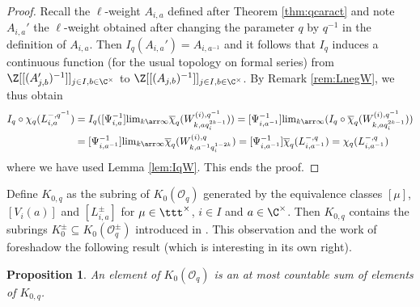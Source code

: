 \documentclass[11pt]{amsart}
\newtheorem{prop}[theorem]{Proposition}
\theoremstyle{definition}
\theoremstyle{remark}
\numberwithin{equation}{section}
\begin{document}
\begin{proof}
Recall the $\ell$-weight $A_{i,a}$ defined after Theorem \ref{thm:qcaract} and note $A_{i,a}'$ the $\ell$-weight obtained after changing the parameter $q$ by $q^{-1}$ in the definition of $A_{i,a}$. Then $I_q(A_{i,a}')= A_{i,a^{-1}}$ and it follows that $I_q$ induces a continuous function (for the usual topology on formal series) from $\Z[[(A_{j,b}')^{-1}]]_{j\in I,b\in\C^{\times}}$ to $\Z[[(A_{j,b})^{-1}]]_{j\in I,b\in\C^{\times}}$. By Remark \ref{rem:LnegW}, we thus obtain
\begin{align*}
I_q \circ \chi_q(L_{i,a}^{-,q^{-1}}) &=
 I_q([\Psi_{i,a}^{-1}]{\textstyle \lim_{k\arr\infty}}\overline{\chi}_q(W_{k,aq_i^{2k-1}}^{(i),q^{-1}})) = [\Psi_{i,a^{-1}}^{-1}]{\textstyle \lim_{k\arr\infty}} (I_q\circ\overline{\chi}_q (W_{k,aq_i^{2k-1}}^{(i),q^{-1}}))\\ &= [\Psi_{i,a^{-1}}^{-1}]{\textstyle \lim_{k\arr\infty}} \overline{\chi}_q(W_{k,a^{-1}q_i^{1-2k}}^{(i),q}) = [\Psi_{i,a^{-1}}^{-1}]\overline{\chi}_q(L_{i,a^{-1}}^{-,q}) = \chi_q(L_{i,a^{-1}}^{-,q})
\end{align*}
where we have used Lemma \ref{lem:IqW}. This ends the proof.
\end{proof}
Define $K_{0,q}$ as the subring of $K_0(\mathcal{O}_q)$ generated by the equivalence classes $[\mu]$, $[V_{i}(a)]$ and $[L_{i,a}^{\pm}]$ for $\mu\in \ttt^{\times}$, $i\in I$ and $a \in \C^{\times}$. Then $K_{0,q}$ contains the subrings $K_0^{\pm} \subseteq K_0(\mathcal{O}^{\pm}_q)$ introduced in \cite[Section 5C]{hl2}. This observation and the work of \cite{hl2} foreshadow the following result (which is interesting in its own right).
\begin{prop}\label{prop:K0q} An element of $K_0(\mathcal{O}_q)$ is an at most countable sum of elements of $K_{0,q}$.
\end{prop}
\end{document}
